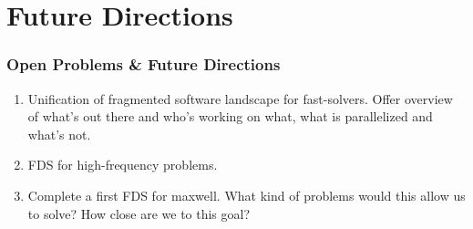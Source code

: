 \section{Future Directions}

\begin{frame}
    \frametitle{Open Problems \& Future Directions}

    \begin{enumerate}
        \item Unification of fragmented software landscape for fast-solvers. Offer overview of what's out there and who's working on what, what is parallelized and what's not.
        \item FDS for high-frequency problems.
        \item Complete a first FDS for maxwell. What kind of problems would this allow us to solve? How close are we to this goal?
    \end{enumerate}
    
\end{frame}